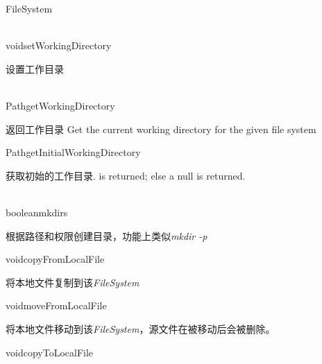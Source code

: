 \begin{XeClass}{FileSystem}

    \begin{XeMethod}{\XePublic \\ \XeAbstract}{void}{setWorkingDirectory}
         
 设置工作目录

    \end{XeMethod}

    \begin{XeMethod}{\XePublic \\ \XeAbstract}{Path}{getWorkingDirectory}
         
 返回工作目录
 Get the current working directory for the given file system

    \end{XeMethod}

    \begin{XeMethod}{\XeProtected}{Path}{getInitialWorkingDirectory}
         
 获取初始的工作目录.
 is returned; else a null is returned.

    \end{XeMethod}

    \begin{XeMethod}{\XePublic \\ \XeAbstract}{boolean}{mkdirs}
         
 根据路径和权限创建目录，功能上类似\emph{mkdir -p}

    \end{XeMethod}

    \begin{XeMethod}{\XePublic}{void}{copyFromLocalFile}
         
 将本地文件复制到该\emph{FileSystem}

    \end{XeMethod}

    \begin{XeMethod}{\XePublic}{void}{moveFromLocalFile}
         
 将本地文件移动到该\emph{FileSystem}，源文件在被移动后会被删除。

    \end{XeMethod}

    \begin{XeMethod}{\XePublic}{void}{copyToLocalFile}
         

\end{XeMethod}
\end{XeClass}
